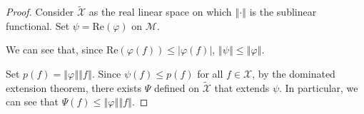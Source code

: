 \documentclass[12pt]{extarticle}
\newcommand{\norm}[1]{\left\Vert #1\right\Vert}
\theoremstyle{plain}
\theoremstyle{definition}
\theoremstyle{note}
\renewcommand{\newline}{\hfill\break}
\begin{document}
\begin{proof}
  Consider $\tilde{\mathcal{X}}$ as the real linear space on which $\norm{\cdot}$ is the sublinear functional. Set $\psi = \text{Re}\left(\varphi\right)$ on $\mathcal{M}$.\newline

  We can see that, since $\text{Re}\left(\varphi(f)\right) \leq |\varphi(f)|$, $\norm{\psi}\leq \norm{\varphi}$.\newline

  Set $p(f) = \norm{\varphi}\norm{f}$. Since $\psi(f) \leq p(f)$ for all $f\in \mathcal{X}$, by the dominated extension theorem, there exists $\Psi$ defined on $\tilde{\mathcal{X}}$ that extends $\psi$. In particular, we can see that $\Psi(f) \leq \norm{\varphi}\norm{f}$.\newline


\end{proof}
\end{document}
